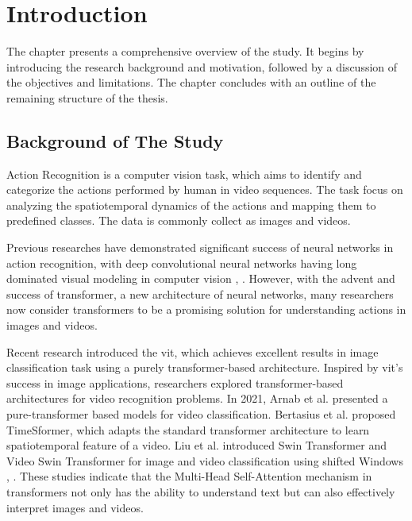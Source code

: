 
\chapter{Introduction}
\label{chap:introduction}
The chapter presents a comprehensive overview of the study. It begins by introducing the research background and motivation, followed by a discussion of the objectives and limitations. The chapter concludes with an outline of the remaining structure of the thesis.

\section{Background of The Study}
\label{sec:background}
Action Recognition is a computer vision task, which aims to identify and categorize the actions performed by human in video sequences. The task focus on analyzing the spatiotemporal dynamics of the actions and mapping them to predefined classes. The data is commonly collect as images and videos.

Previous researches have demonstrated significant success of neural networks in action recognition, with deep convolutional neural networks having long dominated visual modeling in computer vision \cite{he_deep_2016}, \cite{huang_densely_2018}.
However, with the advent and success of transformer, a new architecture of neural networks, many researchers now consider transformers to be a promising solution for understanding actions in images and videos.

Recent research \cite{dosovitskiy_image_2021} introduced the \gls{vit}, which achieves excellent results in image classification task using a purely transformer-based architecture. Inspired by \gls{vit}'s success in image applications, researchers explored transformer-based architectures for video recognition problems. In 2021, Arnab et al. \cite{arnab_vivit_2021} presented a pure-transformer based models for video classification. Bertasius et al. 
\cite{bertasius_is_2021} proposed TimeSformer, which adapts the standard transformer architecture to learn spatiotemporal feature of a video. Liu et al. introduced Swin Transformer and Video Swin Transformer for image and video classification using shifted Windows \cite{liu2021swin}, \cite{liu_video_2021}. These studies indicate that the Multi-Head Self-Attention mechanism in transformers not only has the ability to understand text but can also effectively interpret images and videos.

